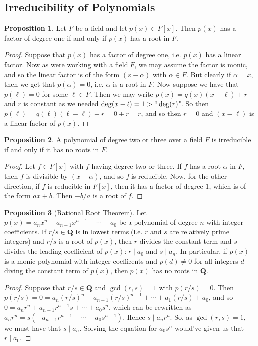 \documentclass[9pt,reqno]{amsart}
\theoremstyle{definition}
\newtheorem{prop}{Proposition}[section]
\newcommand{\qq}{\mathbf Q}
\begin{document}
\subsection{Irreducibility of Polynomials}

\begin{prop}
Let $F$ be a field and let $p(x) \in F[x]$. Then $p(x)$ has a factor of degree one if and only if $p(x)$ has a root in $F$.
\end{prop}
\begin{proof}
	Suppose that $p(x)$ has a factor of degree one, i.e. $p(x)$ has a linear factor. Now as were working with a field $F$, we may assume the factor is monic, and so the linear factor is of the form $(x- \alpha )$ with $\alpha \in F$. But clearly if $\alpha = x$, then we get that $p( \alpha ) = 0$, i.e. $\alpha$ is a root in $F$. Now suppose we have that $p (\ell ) = 0$ for some $\ell \in F$. Then we may write $p(x) = q(x)(x-\ell) + r$ and $r$ is constant as we needed $\deg (x - \ell ) = 1 > ``\deg (r)$". So then $p (\ell) = q(\ell) (\ell- \ell) + r = 0 +r = r$, and so then $r = 0 $ and $(x-\ell)$ is a linear factor of $p(x)$. 
\end{proof}	
\begin{prop}A polynomial of degree two or three over a field $F$ is irreducible if and only if it has no roots in $F$.
\end{prop}
\begin{proof}
	Let $f \in F[x]$ with $f$ having degree two or three. If $f$ has a root $\alpha$ in $F$, then $f$ is divisible by $(x-\alpha)$, and so $f$ is reducible. Now, for the other direction, if $f$ is reducible in $F[x]$, then it has a factor of degree $1$, which is of the form $ax+b$. Then $-b/a$ is a root of $f$. 
\end{proof}
\begin{prop}[Rational Root Theorem]
Let $p(x) = a_n x^n + a_{n-1} x^{n-1} + \cdots + a_0$ be a polynomial of degree $n$ with integer coefficients. If $r/s \in \qq$ is in lowest terms (i.e. $r$ and $s$ are relatively prime integers) and $r/s$ is a root of $p(x)$, then $r$ divides the constant term and $s$ divides the leading coefficient of $p(x)$:  $r \mid a_0$ and $s \mid a_n$. In particular, if $p(x)$ is a monic polynomial with integer coefficents and $p(d) \neq 0$ for all integers $d$ diving the constant term of $p(x)$, then $p(x)$ has no roots in $\qq$. 
\end{prop}
\begin{proof} Suppose that $r/s \in \qq$ and $\gcd (r, s) = 1$ with $p(r/s) = 0$. Then 
	$p(r/s) = 0 = a_n (r/s)^n + a_{n-1} (r/s)^{n-1} + \cdots + a_1 (r/s) + a_0$, and so $ 0 = a_n r^n +a_{n-1} r^{n-1}s  + \cdots + a_0 s^n$, which can be rewritten as $a_n r^n = s(-a_{n-1} r^{n-1}  - \cdots - a_0 s^{n-1})$. Hence $s \mid a_n r^n$. So, as $\gcd (r,s) = 1$, we must have that $s \mid a_n$. Solving the equation for $a_0 s^n$ would've given us that $ r \mid a_0$. 
\end{proof}
\end{document}
